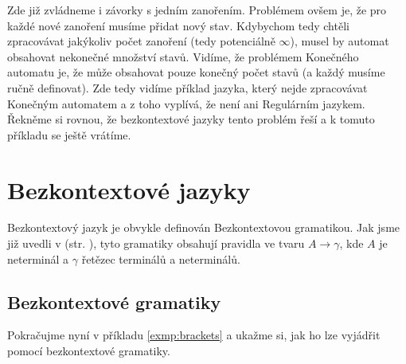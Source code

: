 \begin{exmp}
  Zde již zvládneme i závorky s jedním zanořením. Problémem ovšem je, že
  pro každé nové zanoření musíme přidat nový stav.
  Kdybychom tedy chtěli zpracovávat jakýkoliv počet zanoření (tedy potenciálně $\infty$),
  musel by automat obsahovat nekonečné množství stavů.
  Vidíme, že problémem Konečného automatu je, že může obsahovat pouze konečný
  počet stavů (a každý musíme ručně definovat).
  Zde tedy vidíme příklad jazyka, který nejde zpracovávat Konečným automatem
  a z toho vyplívá, že není ani Regulárním jazykem.
  Řekněme si rovnou, že bezkontextové jazyky tento problém řeší a k tomuto
  příkladu se ještě vrátíme.

\end{exmp}

\section{Bezkontextové jazyky}

Bezkontextový jazyk je obvykle definován Bezkontextovou gramatikou.
Jak jsme již uvedli v  (str. \pageref{chomsky:hierarchy}),
tyto gramatiky obsahují pravidla ve tvaru $A \rightarrow \gamma$, kde $A$ je neterminál a
$\gamma$ řetězec terminálů a neterminálů.

\subsection{Bezkontextové gramatiky}
\label{subsec:contextFreeGrammars}
Pokračujme nyní v příkladu \ref{exmp:brackets} a ukažme si, jak ho lze
vyjádřit pomocí bezkontextové gramatiky.\\

